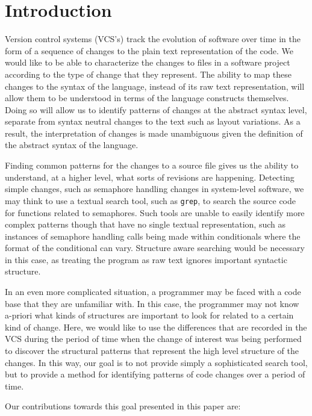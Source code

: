 \section{Introduction}

Version control systems (VCS's) track the evolution of software over time in
the form of a sequence of changes to the plain text representation of the
code. We would like to be able to characterize the changes to files in a
software project according to the type of change that they represent.  The
ability to map these changes to the syntax of the language, instead of its raw
text representation, will allow them to be understood in terms of the language
constructs themselves.  Doing so will allow us to identify patterns of changes
at the abstract syntax level, separate from syntax neutral changes to the text
such as layout variations.  As a result, the interpretation of changes is
made unambiguous given the definition of the abstract syntax of the language.

Finding common patterns for the changes to a source file gives us the ability
to understand, at a higher level, what sorts of revisions are happening.
Detecting simple changes, such as semaphore handling changes in system-level
software, we may think to use a textual search tool, such as {\tt grep}, to
search the source code for functions related to semaphores. Such tools are
unable to easily identify more complex patterns though that have no single
textual representation, such as instances of semaphore handling calls being made
within conditionals where the format of the conditional can vary.  Structure
aware searching would be necessary in this case, as treating the program as
raw text ignores important syntactic structure.

In an even more complicated situation, a programmer may be faced with a
code base that they are unfamiliar with.  In this case, the programmer may not
know a-priori what kinds of structures are important to look for related to
a certain kind of change.  Here, we would like to use the differences that are
recorded in the VCS during the period of time when the change of interest was
being performed to discover the structural patterns that represent the high
level structure of the changes.  In this way, our goal is to not provide simply
a sophisticated search tool, but to provide a method for identifying patterns 
of code changes over a period of time.

Our contributions towards this goal presented in this paper are:


